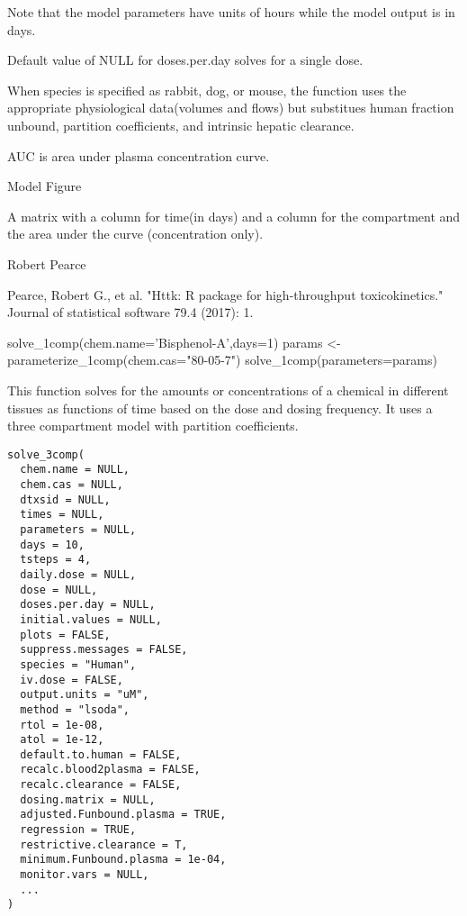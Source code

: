 \documentclass[a4paper]{book}
\begin{document}
%
\begin{Details}\relax
Note that the model parameters have units of hours while the model output is
in days.

Default value of NULL for doses.per.day solves for a single dose.

When species is specified as rabbit, dog, or mouse, the function uses the
appropriate physiological data(volumes and flows) but substitues human
fraction unbound, partition coefficients, and intrinsic hepatic clearance.

AUC is area under plasma concentration curve.

Model Figure 

\end{Details}
%
\begin{Value}
A matrix with a column for time(in days) and a column for the
compartment and the area under the curve (concentration only).
\end{Value}
%
\begin{Author}\relax
Robert Pearce
\end{Author}
%
\begin{References}\relax
Pearce, Robert G., et al. "Httk: R package for high-throughput
toxicokinetics." Journal of statistical software 79.4 (2017): 1.
\end{References}
%
\begin{Examples}
\begin{ExampleCode}

solve_1comp(chem.name='Bisphenol-A',days=1)
params <- parameterize_1comp(chem.cas="80-05-7")
solve_1comp(parameters=params)

\end{ExampleCode}
\end{Examples}
\graphicspath{{"C:/Users/jwambaug/git/httk/httk/man/figures/"}}
%
\begin{Description}\relax
This function solves for the amounts or concentrations of a chemical in
different tissues as functions of time based on the dose and dosing
frequency.  It uses a three compartment model with partition coefficients.
\end{Description}
%
\begin{Usage}
\begin{verbatim}
solve_3comp(
  chem.name = NULL,
  chem.cas = NULL,
  dtxsid = NULL,
  times = NULL,
  parameters = NULL,
  days = 10,
  tsteps = 4,
  daily.dose = NULL,
  dose = NULL,
  doses.per.day = NULL,
  initial.values = NULL,
  plots = FALSE,
  suppress.messages = FALSE,
  species = "Human",
  iv.dose = FALSE,
  output.units = "uM",
  method = "lsoda",
  rtol = 1e-08,
  atol = 1e-12,
  default.to.human = FALSE,
  recalc.blood2plasma = FALSE,
  recalc.clearance = FALSE,
  dosing.matrix = NULL,
  adjusted.Funbound.plasma = TRUE,
  regression = TRUE,
  restrictive.clearance = T,
  minimum.Funbound.plasma = 1e-04,
  monitor.vars = NULL,
  ...
)
\end{verbatim}
\end{Usage}
\end{document}
